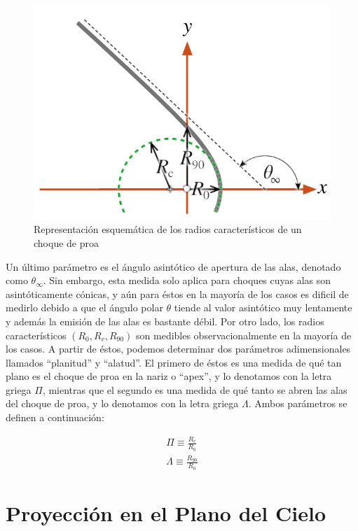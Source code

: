 \begin{figure}
  \includegraphics[width=0.5\linewidth]{./Figures/characteristic-radii}
  \caption{Representación esquemática de los radios característicos de un choque de proa}
  \label{fig:char-radii}
\end{figure}
Un último parámetro es el ángulo asintótico de apertura de las alas, denotado como $\theta_\infty$. Sin embargo, esta medida solo aplica para choques cuyas alas son asintóticamente cónicas, y aún para éstos en la mayoría de los casos es dificil de medirlo debido a que el ángulo polar $\theta$ tiende al valor asintótico muy lentamente y además la emisión de las alas es bastante débil. Por otro lado, los radios característicos $(R_0, R_c, R_{90})$ son medibles observacionalmente en la mayoría de los casos. A partir de éstos, podemos determinar dos parámetros adimensionales llamados ``planitud'' y ``alatud''. El primero de éstos es una medida de qué tan plano es el choque de proa en la nariz o ``apex'', y lo denotamos con la letra griega $\Pi$, mientras que el segundo es una medida de qué tanto se abren las alas del choque de proa, y lo denotamos con la letra griega $\Lambda$. Ambos parámetros se definen a continuación:

\begin{align}
  \Pi \equiv \frac{R_c}{R_0} \label{eq:planitude}\\
  \Lambda \equiv \frac{R_{90}}{R_0} \label{eq:alatude}
\end{align}

\section{Proyección en el Plano del Cielo}
\label{sec:projection}

